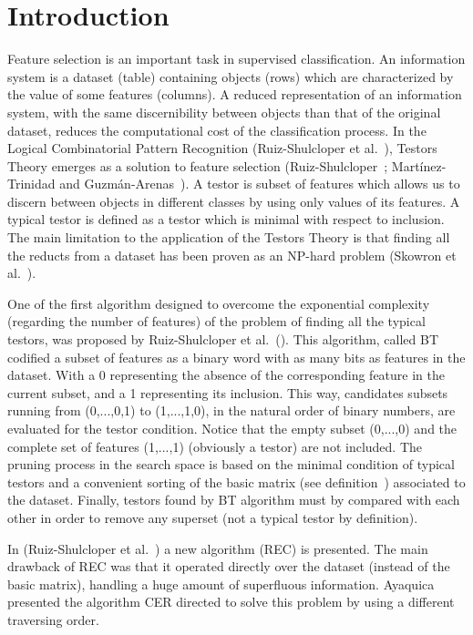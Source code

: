 \documentclass[citeauthoryear]{llncs}
\begin{document}
\section{Introduction}
%
	Feature selection is an important task in supervised classification. An 
	information system is a dataset (table) containing objects (rows) which are
	characterized by the value of some features (columns). A reduced 
	representation of an information system, with the same discernibility
	between objects than that of the original dataset, reduces the computational
	cost of the classification process. In the Logical Combinatorial Pattern 
	Recognition (Ruiz-Shulcloper et al.~\cite{Shulcloper1995}), Testors Theory 
	emerges as a solution to feature selection (Ruiz-Shulcloper~\cite{Shulcloper2008};
	Mart\'inez-Trinidad and	Guzm\'an-Arenas~\cite{Martinez2001}). A testor is subset of 
	features which allows us to discern between objects in different classes by 
	using only values of its features. A typical testor is defined as a testor which 
	is minimal with respect to inclusion. The main limitation to the application of
	the Testors Theory is that finding all the reducts from a dataset has been proven
	as an NP-hard problem (Skowron et al.~\cite{Skowron1992}).
	
	One of the first algorithm designed to overcome the exponential complexity (regarding
	the number of features) of the problem of finding all the typical testors, was 
	proposed by Ruiz-Shulcloper et al.~(\cite{Shulcloper1985}). This algorithm, called BT
	codified a subset of features as a binary word with as many bits as features in the 
	dataset. With a 0 representing the absence of the corresponding feature in the current
	subset, and a 1 representing its inclusion. This way, candidates subsets running from
	(0,...,0,1) to (1,...,1,0), in the natural order of binary numbers, are evaluated for 
	the testor condition. Notice that the empty subset (0,...,0) and the complete set of
	features (1,...,1) (obviously a testor) are not included. The pruning process in the
	search space is based on the minimal condition of typical testors and a convenient sorting
	of the basic matrix (see definition~\cite{def:BM}) associated to the dataset. Finally, 
	testors found by BT algorithm must by compared with each other in order to remove
	any superset (not a typical testor by definition).
	
	In (Ruiz-Shulcloper et al.~\cite{Shulcloper1995b}) a new algorithm (REC) is presented.
	The main drawback of REC was that it operated directly over the dataset (instead of the
	basic matrix), handling a huge amount of superfluous information. Ayaquica~\cite{Ayaquica1997}
	presented the algorithm CER directed to solve this problem by using a different traversing
	order. 
	
\end{document}

